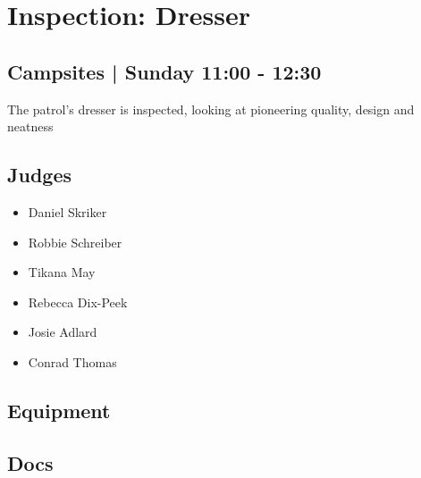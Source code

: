 \documentclass[10pt]{article}
\begin{document}
		\begin{minipage}{\linewidth}
		\setcounter{section}{42}
	\section{Inspection: Dresser }
	\subsection*{Campsites | Sunday 11:00 - 12:30}

	The patrol's dresser is inspected, looking at pioneering quality, design and neatness

	\begin{multicols}{2}
	\subsection*{\faUsers \: Judges}
	\begin{itemize}
			\item Daniel Skriker
			\item Robbie Schreiber
			\item Tikana May
			\item Rebecca Dix-Peek
			\item Josie Adlard
			\item Conrad Thomas
		\end{itemize}
	\columnbreak
	\subsection*{\faWrench \: Equipment}
	        \vfill\null
        \subsection*{\faFile \: Docs}
     	\end{multicols}


	\vspace{1cm}
	\end{minipage}
\end{document}
